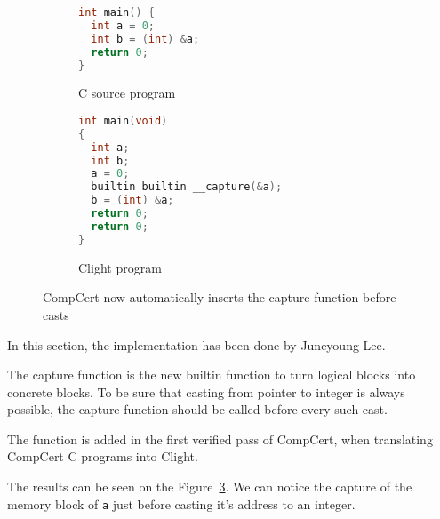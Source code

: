 \label{sec:capturesem}

\begin{figure}
\begin{subfigure}{.48\textwidth}
  \begin{lstlisting}[language=C]
int main() {
  int a = 0;
  int b = (int) &a;
  return 0;
}
  \end{lstlisting}
  \caption{C source program}
  \label{fig:capturec}
\end{subfigure}
\begin{subfigure}{.48\textwidth}
  \begin{lstlisting}[language=C]
int main(void)
{
  int a;
  int b;
  a = 0;
  builtin builtin __capture(&a);
  b = (int) &a;
  return 0;
  return 0;
}
  \end{lstlisting}
  \caption{Clight program}
  \label{fig:captureclight}
\end{subfigure}
\caption{CompCert now automatically inserts the capture function before casts}
\label{fig:captureexample}
\end{figure}



In this section, the implementation has been done by Juneyoung Lee.

The capture function is the new builtin function to turn logical blocks into concrete blocks.
To be sure that casting from pointer to integer is always possible, the capture function should be called before every such cast.

The function is added in the first verified pass of CompCert, when translating CompCert C programs into Clight.

The results can be seen on the Figure~\ref{fig:captureexample}. We can notice the capture of the memory block of \texttt{a} just before casting it's address to an integer.
